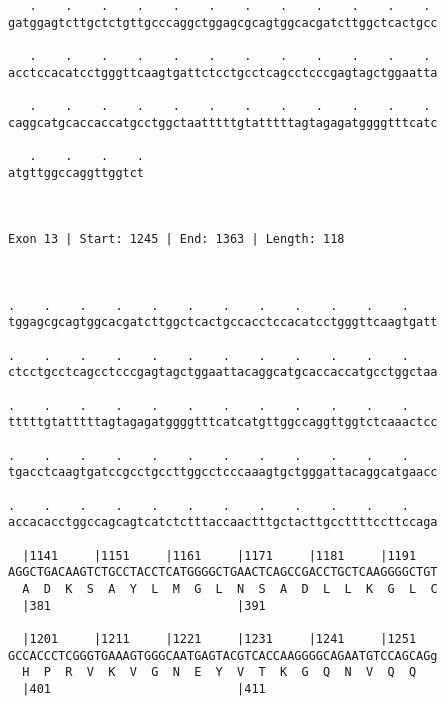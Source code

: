 \documentclass{article}
\begin{document}
\begin{Verbatim}
   .    .    .    .    .    .    .    .    .    .    .    . 
gatggagtcttgctctgttgcccaggctggagcgcagtggcacgatcttggctcactgcc
                                                            
   .    .    .    .    .    .    .    .    .    .    .    . 
acctccacatcctgggttcaagtgattctcctgcctcagcctcccgagtagctggaatta
                                                            
   .    .    .    .    .    .    .    .    .    .    .    . 
caggcatgcaccaccatgcctggctaatttttgtatttttagtagagatggggtttcatc
                                                            
   .    .    .    .
atgttggccaggttggtct
                   
                   
 
Exon 13 | Start: 1245 | End: 1363 | Length: 118



.    .    .    .    .    .    .    .    .    .    .    .    
tggagcgcagtggcacgatcttggctcactgccacctccacatcctgggttcaagtgatt
                                                            
.    .    .    .    .    .    .    .    .    .    .    .    
ctcctgcctcagcctcccgagtagctggaattacaggcatgcaccaccatgcctggctaa
                                                            
.    .    .    .    .    .    .    .    .    .    .    .    
tttttgtatttttagtagagatggggtttcatcatgttggccaggttggtctcaaactcc
                                                            
.    .    .    .    .    .    .    .    .    .    .    .    
tgacctcaagtgatccgcctgccttggcctcccaaagtgctgggattacaggcatgaacc
                                                            
.    .    .    .    .    .    .    .    .    .    .    .    
accacacctggccagcagtcatctctttaccaactttgctacttgccttttccttccaga
                                                            
  |1141     |1151     |1161     |1171     |1181     |1191   
AGGCTGACAAGTCTGCCTACCTCATGGGGCTGAACTCAGCCGACCTGCTCAAGGGGCTGT
  A  D  K  S  A  Y  L  M  G  L  N  S  A  D  L  L  K  G  L  C
  |381                          |391                        
  
  |1201     |1211     |1221     |1231     |1241     |1251   
GCCACCCTCGGGTGAAAGTGGGCAATGAGTACGTCACCAAGGGGCAGAATGTCCAGCAGg
  H  P  R  V  K  V  G  N  E  Y  V  T  K  G  Q  N  V  Q  Q   
  |401                          |411                        
  

\end{Verbatim}
\end{document}
